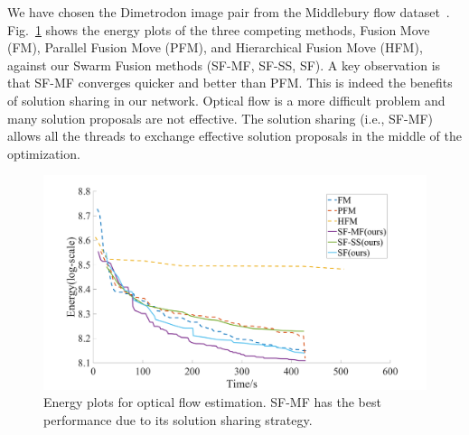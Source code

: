 
\noindent
%
We have chosen the Dimetrodon image pair from the Middlebury flow
dataset~\cite{middlebury_optical_flow}. Fig.~\ref{fig:optical_flow_convergence}
shows the energy plots of the three competing methods, Fusion Move
(FM), Parallel Fusion Move (PFM), and Hierarchical Fusion Move (HFM),
against our Swarm Fusion methods (SF-MF, SF-SS, SF). A key observation
is that SF-MF converges quicker and better than PFM. This is indeed the
benefits of solution sharing in our network. Optical flow is a more
difficult problem and many solution proposals are not effective.
The solution sharing (i.e., SF-MF) allows all the threads to exchange
effective solution proposals in the middle of the
optimization.

\begin{figure}[!h]
  \centering
  \includegraphics[width=0.8\columnwidth]{figure/optical_flow_convergence.png}
  \caption{Energy plots for optical flow estimation. SF-MF has the best
 performance due to its solution sharing strategy.}\label{fig:optical_flow_convergence}
\end{figure}

